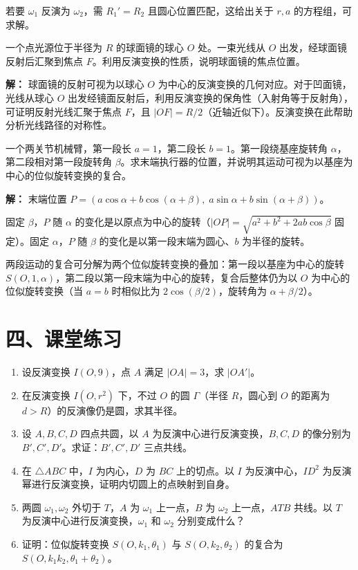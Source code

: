 \documentclass[12pt, a4paper]{ctexart}
\begin{document}
若要 $\omega_1$ 反演为 $\omega_2$，需 $R_1' = R_2$ 且圆心位置匹配，这给出关于 $r, a$ 的方程组，可求解。

\begin{appbox}[【应用2】反演变换与光学反射]
一个点光源位于半径为 $R$ 的球面镜的球心 $O$ 处。一束光线从 $O$ 出发，经球面镜反射后汇聚到焦点 $F$。利用反演变换的性质，说明球面镜的焦点位置。
\end{appbox}

\textbf{解：} 球面镜的反射可视为以球心 $O$ 为中心的反演变换的几何对应。对于凹面镜，光线从球心 $O$ 出发经镜面反射后，利用反演变换的保角性（入射角等于反射角），可证明反射光线汇聚于焦点 $F$，且 $|OF| = R/2$（近轴近似下）。反演变换在此帮助分析光线路径的对称性。

\begin{appbox}[【应用3】位似旋转变换与机械臂]
一个两关节机械臂，第一段长 $a = 1$，第二段长 $b = 1$。第一段绕基座旋转角 $\alpha$，第二段相对第一段旋转角 $\beta$。求末端执行器的位置，并说明其运动可视为以基座为中心的位似旋转变换的复合。
\end{appbox}

\textbf{解：} 末端位置 $P = (a\cos\alpha + b\cos(\alpha + \beta), \; a\sin\alpha + b\sin(\alpha + \beta))$。

固定 $\beta$，$P$ 随 $\alpha$ 的变化是以原点为中心的旋转（$|OP| = \sqrt{a^2 + b^2 + 2ab\cos\beta}$ 固定）。固定 $\alpha$，$P$ 随 $\beta$ 的变化是以第一段末端为圆心、$b$ 为半径的旋转。

两段运动的复合可分解为两个位似旋转变换的叠加：第一段以基座为中心的旋转 $S(O, 1, \alpha)$，第二段以第一段末端为中心的旋转，复合后整体仍为以 $O$ 为中心的位似旋转变换（当 $a = b$ 时相似比为 $2\cos(\beta/2)$，旋转角为 $\alpha + \beta/2$）。

\section*{\textcolor{tipgreen}{四、课堂练习}}

\begin{enumerate}
  \item 设反演变换 $I(O, 9)$，点 $A$ 满足 $|OA| = 3$，求 $|OA'|$。
  \item 在反演变换 $I(O, r^2)$ 下，不过 $O$ 的圆 $\Gamma$（半径 $R$，圆心到 $O$ 的距离为 $d > R$）的反演像仍是圆，求其半径。
  \item 设 $A, B, C, D$ 四点共圆，以 $A$ 为反演中心进行反演变换，$B, C, D$ 的像分别为 $B', C', D'$。求证：$B', C', D'$ 三点共线。
  \item 在 $\triangle ABC$ 中，$I$ 为内心，$D$ 为 $BC$ 上的切点。以 $I$ 为反演中心，$ID^2$ 为反演幂进行反演变换，证明内切圆上的点映射到自身。
  \item 两圆 $\omega_1, \omega_2$ 外切于 $T$，$A$ 为 $\omega_1$ 上一点，$B$ 为 $\omega_2$ 上一点，$ATB$ 共线。以 $T$ 为反演中心进行反演变换，$\omega_1$ 和 $\omega_2$ 分别变成什么？
  \item 证明：位似旋转变换 $S(O, k_1, \theta_1)$ 与 $S(O, k_2, \theta_2)$ 的复合为 $S(O, k_1 k_2, \theta_1 + \theta_2)$。
\end{enumerate}
\end{document}
